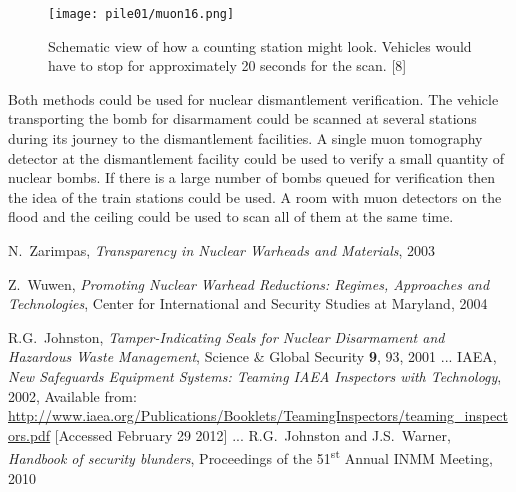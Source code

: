 \documentclass[twocolumn,a4paper]{article}
\begin{document}
\begin{figure}
  \texttt{[image: pile01/muon16.png]}
  \caption{Schematic view of how a counting station might look. Vehicles would have to stop for
approximately 20 seconds for the scan. [8]}
  \label{muon16}
\end{figure}

Both methods could be used for nuclear dismantlement verification. The vehicle transporting the
bomb for disarmament could be scanned at several stations during its journey to the dismantlement
facilities. A single muon tomography detector at the dismantlement facility could be used to verify a
small quantity of nuclear bombs. If there is a large number of bombs queued for verification then
the idea of the train stations could be used. A room with muon detectors on the flood and the ceiling
could be used to scan all of them at the same time.

\begin{thebibliography}
  N.~Zarimpas, \emph{Transparency in Nuclear Warheads and Materials}, 2003

  Z.~Wuwen, \emph{Promoting Nuclear Warhead Reductions: Regimes, Approaches and Technologies}, 
  Center for International and Security Studies at Maryland, 2004

  R.G.~Johnston, \emph{Tamper-Indicating Seals for Nuclear Disarmament and Hazardous Waste Management}, 
  Science \& Global Security \textbf{9}, 93, 2001
...
  IAEA, \emph{New Safeguards Equipment Systems: Teaming IAEA Inspectors with Technology}, 2002, 
  Available from: \url{http://www.iaea.org/Publications/Booklets/TeamingInspectors/teaming_inspectors.pdf} 
  [Accessed February 29 2012]
...
  R.G.~Johnston and J.S.~Warner, \emph{Handbook of security blunders}, Proceedings of the 
  51\textsuperscript{st} Annual INMM Meeting, 2010

\end{thebibliography}
\end{document}
